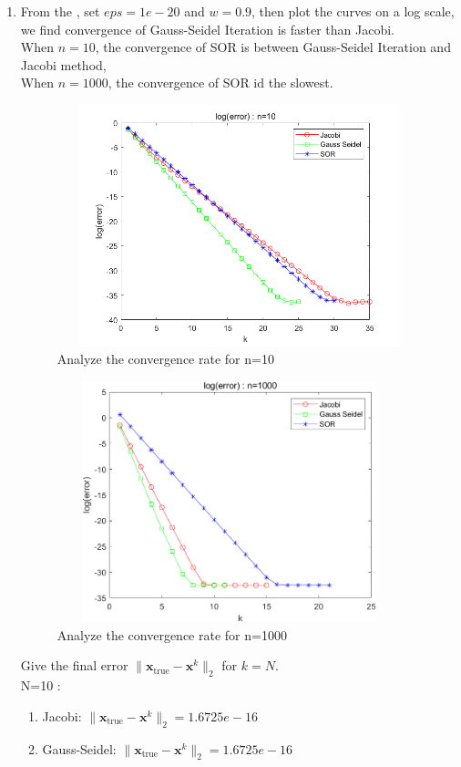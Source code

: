 \documentclass[english,onecolumn]{IEEEtran}
\begin{document}
\begin{enumerate}
	\item From the , set $eps = 1e-20$ and $w=0.9$, then plot the curves on a log scale, we find convergence of Gauss-Seidel Iteration is faster than Jacobi.\\
	When $n=10$, the convergence of SOR is between Gauss-Seidel Iteration and Jacobi method,\\
	When $n=1000$, the convergence of SOR id the slowest.
	\begin{figure}[h]
		\centering
		\includegraphics[height=7cm,width=11cm]{pro3_3_1.png}
		\caption{Analyze the convergence rate for n=10}
		\label{3}
	\end{figure}
\clearpage
\begin{figure}[h]
	\centering
	\includegraphics[height=7cm,width=10cm]{pro3_3_2.png}
	\caption{Analyze the convergence rate for n=1000}
	\label{4}
\end{figure}
Give the final error $\|\mathbf{x}_{\mathrm{true}} - \mathbf{x}^k\|_2$ for $k=N$.\\
N=10 :
\begin{enumerate}
	\item Jacobi: $\|\mathbf{x}_{\mathrm{true}} - \mathbf{x}^k\|_2=1.6725e-16$
	\item Gauss-Seidel: $\|\mathbf{x}_{\mathrm{true}} - \mathbf{x}^k\|_2=1.6725e-16$

\end{enumerate}
\end{enumerate}
\end{document}
